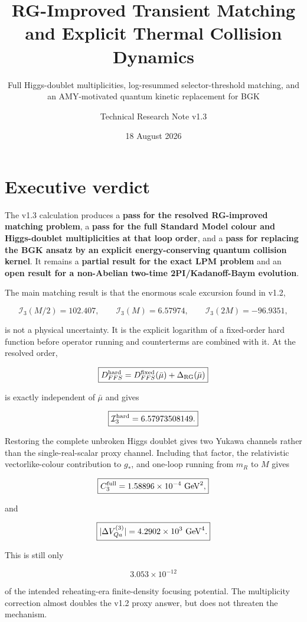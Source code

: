 \documentclass[
  10pt,
]{article}
\title{RG-Improved Transient Matching and Explicit Thermal Collision
Dynamics}
\subtitle{Full Higgs-doublet multiplicities, log-resummed
selector-threshold matching, and an AMY-motivated quantum kinetic
replacement for BGK}
\author{Technical Research Note v1.3}
\date{18 August 2026}
\begin{document}
\maketitle

{
\hypersetup{linkcolor=}
\setcounter{tocdepth}{3}
\tableofcontents
}
\section{Executive verdict}\label{executive-verdict}

The v1.3 calculation produces a \textbf{pass for the resolved
RG-improved matching problem}, a \textbf{pass for the full Standard
Model colour and Higgs-doublet multiplicities at that loop order}, and a
\textbf{pass for replacing the BGK ansatz by an explicit
energy-conserving quantum collision kernel}. It remains a
\textbf{partial result for the exact LPM problem} and an \textbf{open
result for a non-Abelian two-time 2PI/Kadanoff-Baym evolution}.

The main matching result is that the enormous scale excursion found in
v1.2,

\[
\mathcal I_3(M/2)=102.407,
\qquad
\mathcal I_3(M)=6.57974,
\qquad
\mathcal I_3(2M)=-96.9351,
\]

is not a physical uncertainty. It is the explicit logarithm of a
fixed-order hard function before operator running and counterterms are
combined with it. At the resolved order,

\[
\boxed{
D_{FFS}^{\rm hard}
=
D_{FFS}^{\rm fixed}(\bar\mu)
+
\Delta_{\rm RG}(\bar\mu)
}
\]

is exactly independent of \(\bar\mu\) and gives

\[
\boxed{
\mathcal I_3^{\rm hard}=6.57973508149.
}
\]

Restoring the complete unbroken Higgs doublet gives two Yukawa channels
rather than the single-real-scalar proxy channel. Including that factor,
the relativistic vectorlike-colour contribution to \(g_*\), and one-loop
running from \(m_R\) to \(M\) gives

\[
\boxed{
C_3^{\rm full}=1.58896\times10^{-4}\ {\rm GeV}^2,
}
\]

and

\[
\boxed{
|\Delta V_{Qa}^{(3)}|
=4.2902\times10^3\ {\rm GeV}^4.
}
\]

This is still only

\[
\boxed{
3.053\times10^{-12}
}
\]

of the intended reheating-era finite-density focusing potential. The
multiplicity correction almost doubles the v1.2 proxy answer, but does
not threaten the mechanism.
\end{document}
